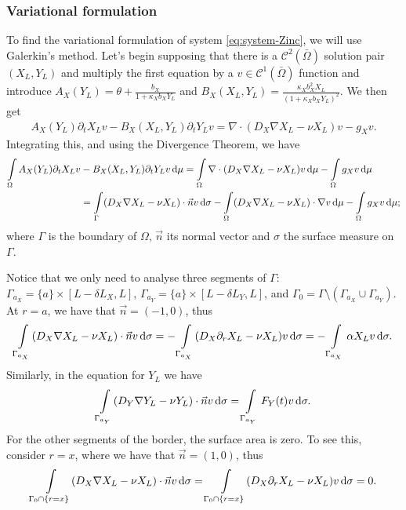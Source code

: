 \documentclass[a4paper,doc,11pt]{article}
\begin{document}
\subsubsection{Variational formulation}

To find the variational formulation of system \eqref{eq:system-Zinc}, we will use Galerkin's method. Let's begin supposing that there is a $\mathcal{C}^2 (\bar \Omega)$ solution pair $(X_L,Y_L)$ and multiply the first equation by a $v \in \mathcal{C}^1 (\bar\Omega)$ function and introduce $A_X(Y_L) = \theta + \frac{b_X}{1 + \kappa_X b_X Y_L}$ and $B_X(X_L,Y_L) = \frac{\kappa_X b_X^2 X_L}{(1+\kappa_X b_X Y_L)^2}$. We then get
\begin{align}
    A_X(Y_L) \partial_t X_L v - B_X(X_L,Y_L) \partial_t Y_L v = \nabla \cdot (D_X \nabla X_L - \nu X_L) v - g_X v.
\end{align}
Integrating this, and using the Divergence Theorem, we have
\begin{align}
    \int\limits_\Omega
    A_X(Y_L) \partial_t X_L v &- B_X(X_L,Y_L) \partial_t Y_L v \dif \mu = 
    \int\limits_\Omega
    \nabla \cdot (D_X \nabla X_L - \nu X_L) v  \dif \mu
    -\int\limits_\Omega g_X v \dif \mu
    \\
    &=
    \int\limits_\Gamma
    (D_X \nabla X_L - \nu X_L) \cdot \vec{n} v
    \dif \sigma
    -\int\limits_\Omega
    (D_X \nabla X_L - \nu X_L) \cdot \nabla v  \dif \mu
    -\int\limits_\Omega g_X v \dif \mu;
\end{align}
where $\Gamma$ is the boundary of $\Omega$, $\vec{n}$ its normal vector and $\sigma$ the surface measure on $\Gamma$. 

Notice that we only need to analyse three segments of $\Gamma$: $\Gamma_{a_X} = \{a\}\times [L-\delta L_X,L]$, $\Gamma_{a_Y} = \{a\} \times [L - \delta L_Y, L]$, and $ \Gamma_0 = \Gamma \setminus (\Gamma_{a_X} \cup \Gamma_{a_Y})$. At $r = a$, we have that $ \vec{n} = (-1,0)$, thus
\begin{align}
    \int\limits_{\Gamma_{a_X}}
    (D_X \nabla X_L - \nu X_L) \cdot \vec{n} v    \dif \sigma
    =
    -
    \int\limits_{\Gamma_{a_X}}
    (D_X \partial_r X_L - \nu X_L) v    \dif \sigma
    =
    -\int\limits_{\Gamma_{a_X}}
    \alpha X_L v    \dif \sigma.
\end{align}
Similarly, in the equation for \(Y_L\) we have
\begin{align}
    \int\limits_{\Gamma_{a_Y}}
    (D_Y \nabla Y_L - \nu Y_L) \cdot \vec{n} v    \dif \sigma
    =
    \int\limits_{\Gamma_{a_Y}}
    F_Y(t) v    \dif \sigma.
\end{align}
For the other segments of the border, the surface area is zero. To see this, consider $r = x$, where we have that $ \vec{n} = (1,0)$, thus
\begin{align}
    \int\limits_{\Gamma_0 \cap \{r=x\}}
    (D_X \nabla X_L - \nu X_L) \cdot \vec{n} v    \dif \sigma
    =
    \int\limits_{\Gamma_0 \cap \{r=x\}}
    (D_X \partial_r X_L - \nu X_L) v    \dif \sigma
    =
    0.
\end{align}
\end{document}
